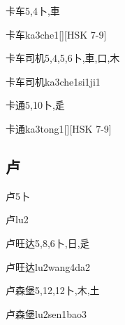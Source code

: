 \begin{Entry}{卡车}{5,4}{⼘,⾞}
  \begin{Phonetics}{卡车}{ka3che1}[][HSK 7-9]
  \end{Phonetics}
\end{Entry}

\begin{Entry}{卡车司机}{5,4,5,6}{⼘,⾞,⼝,⽊}
  \begin{Phonetics}{卡车司机}{ka3che1si1ji1}
  \end{Phonetics}
\end{Entry}

\begin{Entry}{卡通}{5,10}{⼘,⾡}
  \begin{Phonetics}{卡通}{ka3tong1}[][HSK 7-9]
  \end{Phonetics}
\end{Entry}

\subsection*{卢}

\begin{Entry}{卢}{5}{⼘}
  \begin{Phonetics}{卢}{lu2}
  \end{Phonetics}
\end{Entry}

\begin{Entry}{卢旺达}{5,8,6}{⼘,⽇,⾡}
  \begin{Phonetics}{卢旺达}{lu2wang4da2}
  \end{Phonetics}
\end{Entry}

\begin{Entry}{卢森堡}{5,12,12}{⼘,⽊,⼟}
  \begin{Phonetics}{卢森堡}{lu2sen1bao3}
  \end{Phonetics}
\end{Entry}

